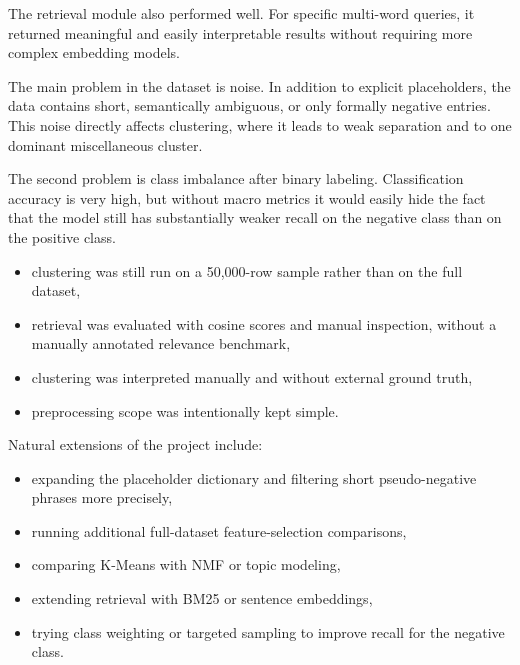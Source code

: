 \documentclass[twoside, 12pt]{article}
\begin{document}
The retrieval module also performed well. For specific multi-word queries, it returned meaningful and easily interpretable results without requiring more complex embedding models.


The main problem in the dataset is noise. In addition to explicit placeholders, the data contains short, semantically ambiguous, or only formally negative entries. This noise directly affects clustering, where it leads to weak separation and to one dominant miscellaneous cluster.

The second problem is class imbalance after binary labeling. Classification accuracy is very high, but without macro metrics it would easily hide the fact that the model still has substantially weaker recall on the negative class than on the positive class.


\begin{itemize}
    \item clustering was still run on a 50,000-row sample rather than on the full dataset,
    \item retrieval was evaluated with cosine scores and manual inspection, without a manually annotated relevance benchmark,
    \item clustering was interpreted manually and without external ground truth,
    \item preprocessing scope was intentionally kept simple.
\end{itemize}


Natural extensions of the project include:

\begin{itemize}
    \item expanding the placeholder dictionary and filtering short pseudo-negative phrases more precisely,
    \item running additional full-dataset feature-selection comparisons,
    \item comparing K-Means with NMF or topic modeling,
    \item extending retrieval with BM25 or sentence embeddings,
    \item trying class weighting or targeted sampling to improve recall for the negative class.
\end{itemize}

\end{document}
